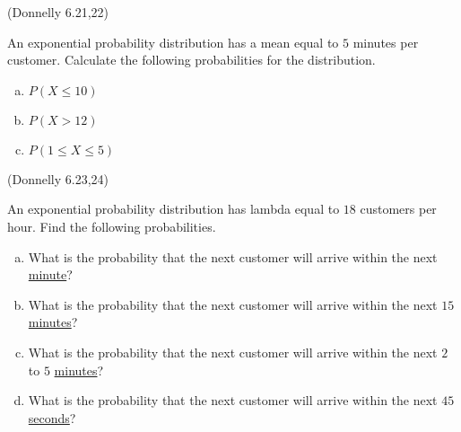 \documentclass[12pt, letterpaper]{article}
\newcounter{exercise}
\theoremstyle{definition}
\begin{document}
\begin{exercise}  (Donnelly 6.21,22)

An exponential probability distribution has a mean equal to $5$ minutes per customer.  Calculate the following probabilities for the distribution.

\end{exercise}

\begin{enumerate}[(a)]

\item $P(X\leq 10)$

\vfill

\item $P(X>12)$

\vfill

\item $P(1\leq X\leq 5)$

\vfill

\end{enumerate}


\begin{exercise}  (Donnelly 6.23,24)

An exponential probability distribution has lambda equal to $18$ customers per hour.  Find the following probabilities.

\end{exercise}


\begin{enumerate}[(a)]

\item What is the probability that the next customer will arrive within the next \underline{minute}?

\vfill

\item What is the probability that the next customer will arrive within the next $15$ \underline{minutes}?

\vfill

\newpage

\item What is the probability that the next customer will arrive within the next $2$ to $5$ \underline{minutes}?

\vfill

\item What is the probability that the next customer will arrive within the next $45$ \underline{seconds}?

\vfill

\end{enumerate}
\end{document}
